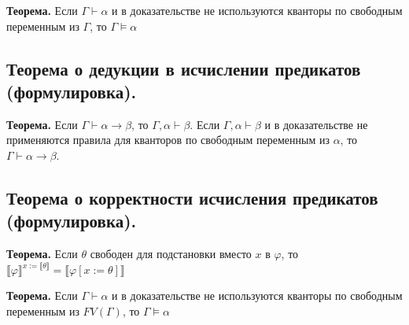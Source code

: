 \documentclass[10pt,a4paper,oneside]{article}
\begin{document}
\noindent \textbf{ Теорема. }
Если $\Gamma\vdash\alpha$ и в доказательстве не используются кванторы по свободным
переменным из $\Gamma$, то $\Gamma\models\alpha$\
\subsection{Теорема о дедукции в исчислении предикатов (формулировка).}
\noindent \textbf{ Теорема. }
Если $\Gamma\vdash\alpha\rightarrow\beta$, то $\Gamma,\alpha\vdash\beta$.
Если $\Gamma,\alpha\vdash\beta$ и в доказательстве не применяются правила для кванторов 
по свободным переменным из $\alpha$, то $\Gamma\vdash\alpha\rightarrow\beta$.

\subsection{Теорема о корректности исчисления предикатов (формулировка).}
\noindent \textbf{ Теорема. }
Если $\theta$ свободен для подстановки 
вместо $x$ в $\varphi$, то $\llbracket\varphi\rrbracket^{x := \llbracket\theta\rrbracket} = \llbracket\varphi[x := \theta]\rrbracket$

\noindent \textbf{ Теорема. }
Если $\Gamma \vdash \alpha$ и в доказательстве не используются кванторы по свободным переменным из $FV(\Gamma)$, то $\Gamma \models \alpha$\
\end{document}
